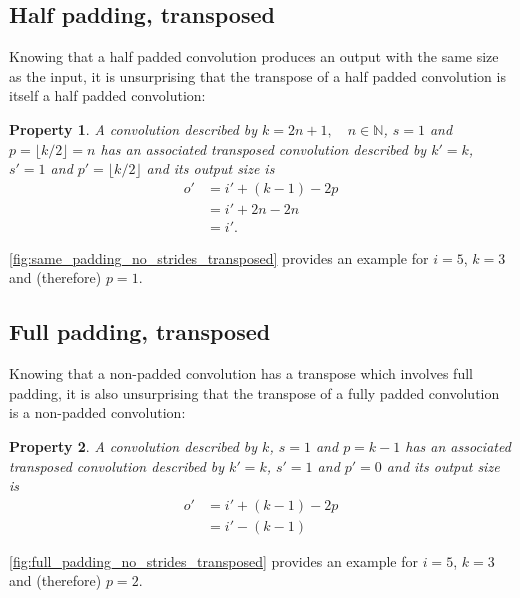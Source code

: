 \documentclass{report}
\newtheorem{prop}{Property}
\begin{document}
\subsection{Half padding, transposed}

Knowing that a half padded convolution produces an output with the same size as
the input, it is unsurprising that the transpose of a half padded convolution
is itself a half padded convolution:

\begin{prop}\label{prop:half_padding_no_strides_transposed}
A convolution described by $k = 2n + 1, \quad n \in \mathbb{N}$, $s = 1$ and $p
= \lfloor k / 2 \rfloor = n$ has an associated transposed convolution described
by $k' = k$, $s' = 1$ and $p' = \lfloor k / 2 \rfloor$ and its output size is
\begin{equation*}
\begin{split}
    o' &= i' + (k - 1) - 2p \\
       &= i' + 2n - 2n \\
       &= i'.
\end{split}
\end{equation*}
\end{prop}

\autoref{fig:same_padding_no_strides_transposed} provides an example for $i =
5$, $k = 3$ and (therefore) $p = 1$.

\subsection{Full padding, transposed}

Knowing that a non-padded convolution has a transpose which involves full
padding, it is also unsurprising that the transpose of a fully padded
convolution is a non-padded convolution:

\begin{prop}\label{prop:full_padding_no_strides_transposed}
A convolution described by $k$, $s = 1$ and $p = k - 1$ has an associated
transposed convolution described by $k' = k$, $s' = 1$ and $p' = 0$ and its
output size is
\begin{equation*}
\begin{split}
    o' &= i' + (k - 1) - 2p \\
       &= i' - (k - 1)
\end{split}
\end{equation*}
\end{prop}

\autoref{fig:full_padding_no_strides_transposed} provides an example for $i =
5$, $k = 3$ and (therefore) $p = 2$.
\end{document}
